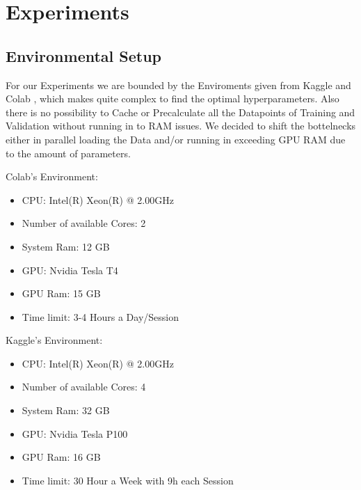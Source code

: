 \section{Experiments}\label{sec:experiments}

\subsection{Environmental Setup}
For our Experiments we are bounded by the Enviroments given from Kaggle \cite{noauthor_kaggle_nodate} and Colab \cite{noauthor_google_nodate}, 
which makes quite complex to find the optimal hyperparameters. Also there is no possibility to Cache or Precalculate all the Datapoints of
Training and Validation without running in to RAM issues. We decided to shift the bottelnecks either in parallel loading the
Data and/or running in exceeding GPU RAM due to the amount of parameters.

\vspace{0.3cm}

\begin{minipage}{0.5\textwidth}
    Colab's Environment:
    \begin{itemize}
        \item CPU: Intel(R) Xeon(R) @ 2.00GHz
        \item Number of available Cores: 2
        \item System Ram: 12 GB
        \item GPU: Nvidia Tesla T4
        \item GPU Ram: 15 GB
        \item Time limit: 3-4 Hours a Day/Session
    \end{itemize}
\end{minipage}
\begin{minipage}{0.5\textwidth}
    Kaggle's Environment:
    \begin{itemize}
        \item CPU: Intel(R) Xeon(R) @ 2.00GHz
        \item Number of available Cores: 4
        \item System Ram: 32 GB
        \item GPU: Nvidia Tesla P100
        \item GPU Ram: 16 GB
        \item Time limit: 30 Hour a Week with 9h each Session
    \end{itemize}
\end{minipage}

